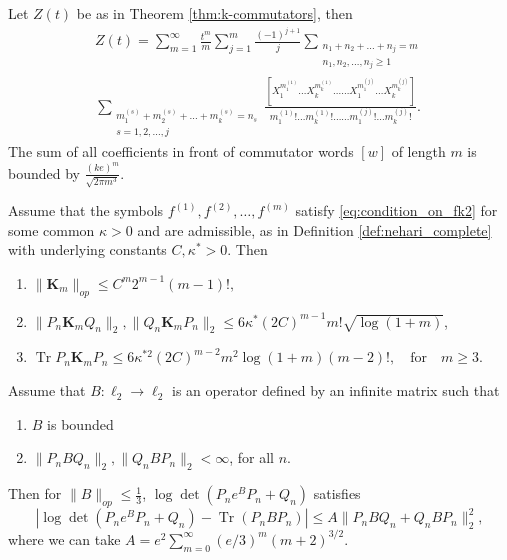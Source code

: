 \documentclass[10pt,a4paper]{amsart}
\DeclareMathOperator{\Tr}{Tr}
\begin{document}
\begin{corollary}\label{cor:k-commutators}
Let $Z(t)$ be as in Theorem \ref{thm:k-commutators}, then
\begin{multline}\label{eqn:commutator_expansion}
Z(t)
=\sum_{m=1}^{\infty}\frac{t^m}{m} 
%
\sum_{j=1}^{m}\frac{(-1)^{j+1}}{j}
%
\sum_{
\substack{
n_1+n_2+\ldots +n_j=m
\\n_1,n_2,\ldots,n_j\geq 1
}}
\\ 
\sum_{
\substack{
m_1^{(s)}+m_2^{(s)}+\ldots +m_k^{(s)}=n_s
\\
s=1,2,\ldots, j 
}
}
%
\frac
{[X_1^{m_1^{(1)}}\ldots X_k^{m_k^{(1)}}\ldots \ldots X_1^{m_1^{(j)}}\ldots X_k^{m_k^{(j)}}]}
{m_1^{(1)}! \ldots m_k^{(1)}!\ldots\ldots m_1^{(j)}! \ldots m_k^{(j)}!}.
\end{multline}
The sum of all coefficients in front of commutator words $[w]$ of length $m$ is bounded by $\frac{(ke)^m}{\sqrt{2\pi m^3}}$.
\end{corollary}

\begin{theorem}\label{thm:bound_on_difficult_nested}
Assume that the symbols $f^{(1)},f^{(2)},\ldots, f^{(m)}$ satisfy \eqref{eq:condition_on_fk2} for some common $\kappa>0$ and
are admissible, as in Definition \ref{def:nehari_complete} with underlying constants $C, \kappa^*>0$. 
%
%
%
Then
\begin{enumerate}
\item $\|\mathbf{K}_m\|_{op}\leq 
%
C^m 2^{m-1}(m-1)!,
$
\item $\|P_n\mathbf{K}_mQ_n\|_{2}, \|Q_n\mathbf{K}_mP_n\|_{2}\leq  6\kappa^* (2C)^{m-1} m! \sqrt{\log(1+m)}$,
\item $\Tr  P_n \mathbf{K}_m P_n \leq 
6 \kappa^{*2}  (2C)^{m-2} m^2\log(1+m)(m-2)!,
\quad\text{for}\quad m\geq 3.$
\end{enumerate}
\end{theorem}

\begin{theorem}\label{thm:generalthm}
Assume that $B:\ell_2\rightarrow\ell_2$ is an operator defined by an infinite matrix such that
\begin{enumerate}
\item $B$ is bounded
\item $\|P_nBQ_n\|_2, \|Q_nBP_n\|_2<\infty$, for all $n$.
\end{enumerate}
Then {for}  $ \|B\|_{op} \leq \frac{1}{3}$, $\log\det(P_ne^{B}P_n+Q_n)$ satisfies
$$\left|\log\det(P_ne^{B}P_n+Q_n)-\Tr (P_nBP_n)\right|\leq A \|P_nBQ_n+ Q_nBP_n\|_2^2,$$
where we can take $A=e^2\sum_{m=0}^{\infty} (e/3)^m (m+2)^{3/2}$.
\end{theorem}
\end{document}
